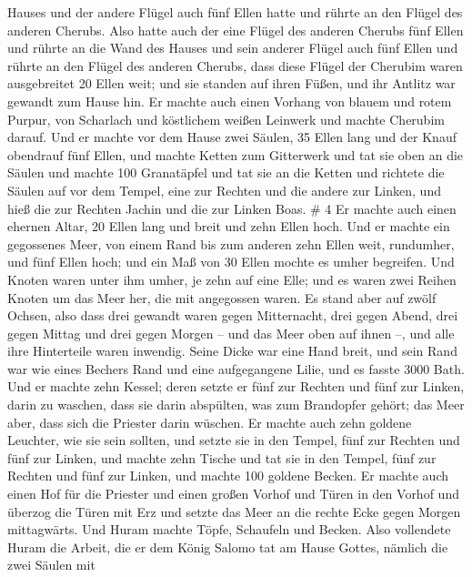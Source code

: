 Hauses und der andere Flügel auch fünf Ellen hatte und rührte an den
Flügel des anderen Cherubs.  Also hatte auch der eine
Flügel des anderen Cherubs fünf Ellen und rührte an die Wand des Hauses
und sein anderer Flügel auch fünf Ellen und rührte an den Flügel des
anderen Cherubs,  dass diese Flügel der Cherubim waren
ausgebreitet 20 Ellen weit; und sie standen auf ihren Füßen, und ihr
Antlitz war gewandt zum Hause hin.  Er machte auch einen
Vorhang von blauem und rotem Purpur, von Scharlach und köstlichem weißen
Leinwerk und machte Cherubim darauf.  Und er machte vor dem
Hause zwei Säulen, 35 Ellen lang und der Knauf obendrauf fünf Ellen,
 und machte Ketten zum Gitterwerk und tat sie oben an die
Säulen und machte 100 Granatäpfel und tat sie an die Ketten
 und richtete die Säulen auf vor dem Tempel, eine zur
Rechten und die andere zur Linken, und hieß die zur Rechten Jachin und
die zur Linken Boas. \# 4  Er machte auch einen ehernen
Altar, 20 Ellen lang und breit und zehn Ellen hoch.  Und er
machte ein gegossenes Meer, von einem Rand bis zum anderen zehn Ellen
weit, rundumher, und fünf Ellen hoch; und ein Maß von 30 Ellen mochte es
umher begreifen.  Und Knoten waren unter ihm umher, je zehn
auf eine Elle; und es waren zwei Reihen Knoten um das Meer her, die mit
angegossen waren.  Es stand aber auf zwölf Ochsen, also dass
drei gewandt waren gegen Mitternacht, drei gegen Abend, drei gegen
Mittag und drei gegen Morgen -- und das Meer oben auf ihnen --, und alle
ihre Hinterteile waren inwendig.  Seine Dicke war eine Hand
breit, und sein Rand war wie eines Bechers Rand und eine aufgegangene
Lilie, und es fasste 3000 Bath.  Und er machte zehn Kessel;
deren setzte er fünf zur Rechten und fünf zur Linken, darin zu waschen,
dass sie darin abspülten, was zum Brandopfer gehört; das Meer aber, dass
sich die Priester darin wüschen.  Er machte auch zehn
goldene Leuchter, wie sie sein sollten, und setzte sie in den Tempel,
fünf zur Rechten und fünf zur Linken,  und machte zehn
Tische und tat sie in den Tempel, fünf zur Rechten und fünf zur Linken,
und machte 100 goldene Becken.  Er machte auch einen Hof für
die Priester und einen großen Vorhof und Türen in den Vorhof und überzog
die Türen mit Erz  und setzte das Meer an die rechte Ecke
gegen Morgen mittagwärts.  Und Huram machte Töpfe,
Schaufeln und Becken. Also vollendete Huram die Arbeit, die er dem König
Salomo tat am Hause Gottes,  nämlich die zwei Säulen mit
